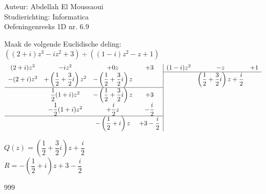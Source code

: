 \documentclass[a4paper]{article}
\begin{document}
  
\noindent \large Auteur: Abdellah El Moussaoui \\
\noindent \large Studierichting: Informatica\\
\noindent \large Oefeningenreeks 1D nr. 6.9\\

\medskip

\normalsize

Maak de volgende Euclidische deling: \\

$((2+i)z^3-iz^2+3) \div ((1-i)z^2-z+1)$\\


\[
\begin{array}{cccc|ccc}
(2+i)z^3 & -iz^2 & +0z & +3 & (1-i)z^2 & -z & +1 \\ \cline{5-7}

-(2+i)z^3
& +\left(\dfrac{1}{2}+\dfrac{3}{2} i\right)z^2
& -\left(\dfrac{1}{2}+\dfrac{3}{2} i\right)z
& 
& & \left(\dfrac{1}{2}+\dfrac{3}{2} i\right)z + \dfrac{i}{2} & \\ \cline{1-4}


& \dfrac12(1+i)z^2
& -\left(\dfrac12+\dfrac32 i\right)z
& +3
& & & \\


& -\dfrac12(1+i)z^2
& +\dfrac{i}{2}z
& -\dfrac{i}{2}
& &  & \\ \cline{1-4}

& 
& -\left(\dfrac12+i\right)z
& +3-\dfrac{i}{2}
& & &
\end{array}
\]


$Q(z) = \left(\dfrac{1}{2}+\dfrac{3}{2} i\right)z + \dfrac{i}{2}$\\

$R = -\left(\dfrac12+i\right)z +3-\dfrac{i}{2} $\\

\begin{thebibliography}{999}
\end{thebibliography}
\end{document}
